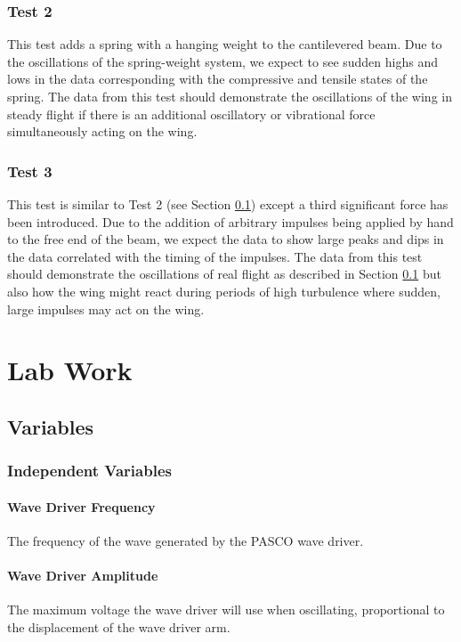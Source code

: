 \documentclass[12 pt]{report}
\begin{document}
\subsection{Test 2} \label{hypothesis-test_2}
This test adds a spring with a hanging weight to the cantilevered beam. Due to the oscillations of the spring-weight system, we expect to see sudden highs and lows in the data corresponding with the compressive and tensile states of the spring. The data from this test should demonstrate the oscillations of the wing in steady flight if there is an additional oscillatory or vibrational force simultaneously acting on the wing.

\subsection{Test 3} \label{hypothesis-test_3}
This test is similar to Test \num{2} (see Section \ref{hypothesis-test_2}) except a third significant force has been introduced. Due to the addition of arbitrary impulses being applied by hand to the free end of the beam, we expect the data to show large peaks and dips in the data correlated with the timing of the impulses. The data from this test should demonstrate the oscillations of real flight as described in Section \ref{hypothesis-test_2} but also how the wing might react during periods of high turbulence where sudden, large impulses may act on the wing.

\chapter{Lab Work} \label{lab_work}
\section{Variables} \label{variables}
\subsection{Independent Variables} \label{variables-independent_variables}
\subsubsection{Wave Driver Frequency} \label{variables-independent_variables-wave_drive_frequency}
The frequency of the wave generated by the PASCO wave driver.

\subsubsection{Wave Driver Amplitude} \label{variables-independent_variables-wave_driver_amplitude}
The maximum voltage the wave driver will use when oscillating, proportional to the displacement of the wave driver arm.
\end{document}
